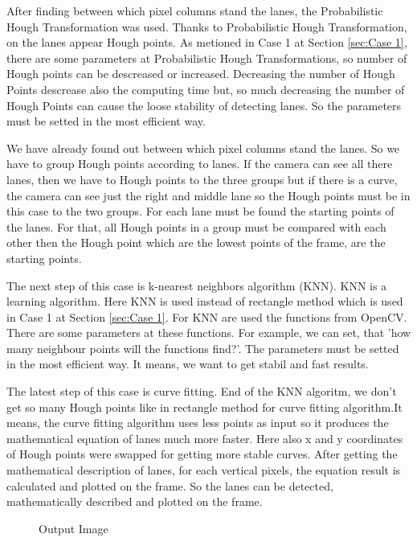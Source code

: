 After finding between which pixel columns stand the lanes, the Probabilistic Hough Transformation was used. Thanks to Probabilistic Hough Transformation, on the lanes appear Hough points. As metioned in Case 1 at Section \ref{sec:Case 1}, there are some parameters at Probabilistic Hough Transformations, so number of Hough points can be descreased or increased. Decreasing the number of Hough Points descrease also the computing time but, so much decreasing the number of Hough Points can cause the loose stability of detecting lanes. So the parameters must be setted in the most efficient way.

We have already found out between which pixel columns stand the lanes. So we have to group Hough points according to lanes. If the camera can see all there lanes, then we have to Hough points to the three groups but if there is a curve, the camera can see just the right and middle lane so the Hough points must be in this case to the two groups. For each lane must be found the starting points of the lanes. For that, all Hough points in a group must be compared with each other then the Hough point which are the lowest points of the frame, are the starting points. 

The next step of this case is k-nearest neighbors algorithm (KNN). KNN is a learning algorithm. Here KNN is used instead of rectangle method which is used in Case 1 at Section \ref{sec:Case 1}. For KNN are used the functions from OpenCV. There are some parameters at these functions. For example, we can set, that 'how many neighbour points will the functions find?'. The parameters must be setted in the most efficient way. It means, we want to get stabil and fast results. 

The latest step of this case is curve fitting. End of the KNN algoritm, we don't get so many Hough points like in rectangle method for curve fitting algorithm.It means, the curve fitting algorithm uses less points as input so it produces the mathematical equation of lanes much more faster. Here also x and y coordinates of Hough points were swapped for getting more stable curves. After getting the mathematical description of lanes, for each vertical pixels, the equation result is calculated and plotted on the frame. So the lanes can be detected, mathematically described and plotted on the frame.

\begin{figure}[H]
  \centering
  \caption{Output Image}
\end{figure} 


